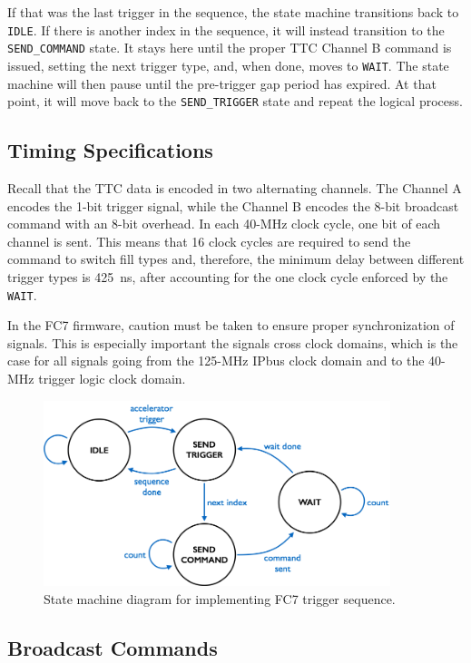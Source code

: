 If that was the last trigger in the sequence, the state machine transitions back to \verb|IDLE|.  If there is another index in the sequence, it will instead transition to the \verb|SEND_COMMAND| state.  It stays here until the proper TTC Channel B command is issued, setting the next trigger type, and, when done, moves to \verb|WAIT|.  The state machine will then pause until the pre-trigger gap period has expired.  At that point, it will move back to the \verb|SEND_TRIGGER| state and repeat the logical process.

\subsection{Timing Specifications}

Recall that the TTC data is encoded in two alternating channels.  The Channel A encodes the 1-bit trigger signal, while the Channel B encodes the 8-bit broadcast command with an 8-bit overhead.  In each 40-MHz clock cycle, one bit of each channel is sent.  This means that 16 clock cycles are required to send the command to switch fill types and, therefore, the minimum delay between different trigger types is 425~ns, after accounting for the one clock cycle enforced by the \verb|WAIT|.

In the FC7 firmware, caution must be taken to ensure proper synchronization of signals.  This is especially important the signals cross clock domains, which is the case for all signals going from the 125-MHz IPbus clock domain and to the 40-MHz trigger logic clock domain.

\begin{figure}[t]
\centering
\includegraphics[width=0.90\textwidth]{images/seq_sm2.png}
\caption{State machine diagram for implementing FC7 trigger sequence.}
\label{seq-sm}
\end{figure}

\subsection{Broadcast Commands}

